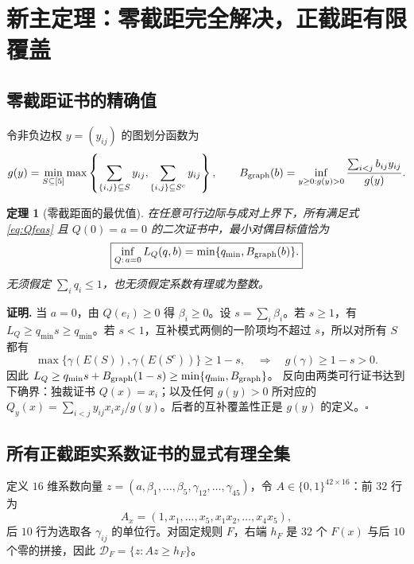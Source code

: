 \documentclass[11pt,a4paper]{ctexart}
\newtheorem{theorem}{定理}[section]
\theoremstyle{definition}
\newenvironment{proofcn}{\par\noindent\textbf{证明.} }{\hfill$\square$\par}
\newcommand{\calD}{\mathcal D}
\begin{document}
\section{新主定理：零截距完全解决，正截距有限覆盖}
\subsection{零截距证书的精确值}
令非负边权 $y=(y_{ij})$ 的图划分函数为
\[
 g(y)=\min_{S\subseteq[5]}
 \max\left\{\sum_{\{i,j\}\subseteq S}y_{ij},
 \sum_{\{i,j\}\subseteq S^c}y_{ij}\right\},
\qquad
B_{\rm graph}(b)=\inf_{y\ge0:g(y)>0}\frac{\sum_{i<j}b_{ij}y_{ij}}{g(y)}.
\]
\begin{theorem}[零截距面的最优值]\label{thm:zero}
在任意可行边际与成对上界下，所有满足式 \eqref{eq:Qfeas} 且 $Q(0)=a=0$ 的二次证书中，最小对偶目标值恰为
\begin{equation}\label{eq:zero}
\boxed{\inf_{Q:\,a=0} L_Q(q,b)=\min\{q_{\min},B_{\rm graph}(b)\}.}
\end{equation}
无须假定 $\sum_iq_i\le1$，也无须假定系数有理或为整数。
\end{theorem}
\begin{proofcn}
当 $a=0$，由 $Q(e_i)\ge0$ 得 $\beta_i\ge0$。设 $s=\sum_i\beta_i$。若 $s\ge1$，有 $L_Q\ge q_{\min}s\ge q_{\min}$。若 $s<1$，互补模式两侧的一阶项均不超过 $s$，所以对所有 $S$ 都有
\[
\max\{\gamma(E(S)),\gamma(E(S^c))\}\ge1-s,
\quad\Longrightarrow\quad g(\gamma)\ge1-s>0.
\]
因此 $L_Q\ge q_{\min}s+B_{\rm graph}(1-s)\ge\min\{q_{\min},B_{\rm graph}\}$。
反向由两类可行证书达到下确界：独裁证书 $Q(x)=x_i$；以及任何 $g(y)>0$ 所对应的 $Q_y(x)=\sum_{i<j}y_{ij}x_ix_j/g(y)$。后者的互补覆盖性正是 $g(y)$ 的定义。\end{proofcn}

\subsection{所有正截距实系数证书的显式有理全集}
定义 $16$ 维系数向量 $z=(a,\beta_1,\dots,\beta_5,\gamma_{12},\dots,\gamma_{45})$，令 $A\in\{0,1\}^{42\times16}$：前 $32$ 行为
\[
A_x=(1,x_1,\ldots,x_5,x_1x_2,\ldots,x_4x_5),
\]
后 $10$ 行为选取各 $\gamma_{ij}$ 的单位行。对固定规则 $F$，右端 $h_F$ 是 $32$ 个 $F(x)$ 与后 $10$ 个零的拼接，因此 $\calD_F=\{z:Az\ge h_F\}$。
\end{document}
